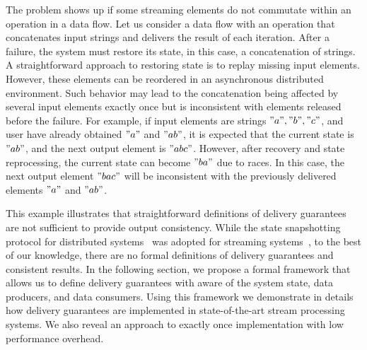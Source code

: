 The problem shows up if some streaming elements do not commutate within an operation in a data flow. Let us consider a data flow with an operation that concatenates input strings and delivers the result of each iteration. After a failure, the system must restore its state, in this case, a concatenation of strings. A straightforward approach to restoring state is to replay missing input elements. However, these elements can be reordered in an asynchronous distributed environment. Such behavior may lead to the concatenation being affected by several input elements exactly once but is inconsistent with elements released before the failure. For example, if input elements are strings $"a","b","c"$, and user have already obtained $"a"$ and $"ab"$, it is expected that the current state is $"ab"$, and the next output element is $"abc"$. However, after recovery and state reprocessing, the current state can become $"ba"$ due to races. In this case, the next output element $"bac"$ will be inconsistent with the previously delivered elements $"a"$ and $"ab"$.  

This example illustrates that straightforward definitions of delivery guarantees are not sufficient to provide output consistency. While the state snapshotting protocol for distributed systems~\cite{Chandy:1985:DSD:214451.214456} was adopted for streaming systems~\cite{2015arXiv150608603C}, to the best of our knowledge, there are no formal definitions of delivery guarantees and consistent results. In the following section, we propose a formal framework that allows us to define delivery guarantees with aware of the system state, data producers, and data consumers. Using this framework we demonstrate in details how delivery guarantees are implemented in state-of-the-art stream processing systems. We also reveal an approach to exactly once implementation with low performance overhead. 